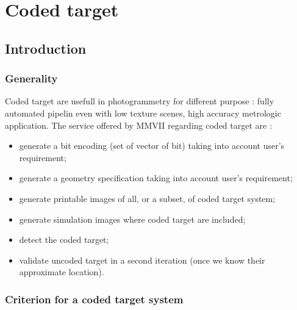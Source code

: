 \chapter{Coded target}
\label{Chap:CodedTarget}



\section{Introduction}


\subsection{Generality}

Coded target are usefull in photogrammetry for different purpose : 
fully automated pipelin even with low texture scenes, high accuracy metrologic application.
The service offered by MMVII regarding coded target are :

\begin{itemize}
    \item generate a bit encoding (set of vector of bit) taking into account 
           user's requirement;

    \item generate a geometry specification taking into account
           user's requirement;

    \item generate printable images of all, or a subset, of coded target system;

    \item generate simulation images where coded target are included;

    \item detect the coded target;

    \item validate uncoded target in a second iteration  (once we know their approximate location).

\end{itemize}



\subsection{Criterion for a coded target system}


